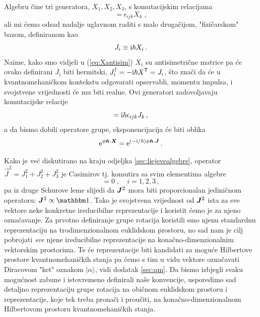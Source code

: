 Algebru čine tri generatora, $X_1, X_2, X_3$, s komutacijskim relacijama
\begin{equation}
          [X_i, X_j] = \epsilon_{ijk} X_k \;,
\end{equation}
ali mi ćemo odsad nadalje uglavnom raditi s malo drugačijom, "fizičarskom" bazom, definiranom
kao
\begin{equation}
 J_i \equiv \textrm{i} \hbar X_i \,.
    \label{eq:jfromX}
\end{equation}
Naime, kako smo vidjeli u (\ref{eq:Xantisim}) $X_i$ su antisimetrične
matrice pa će ovako definirani $J_i$ biti hermitski, $J_{\textrm{i}}^{\dagger}
= - \textrm{i} \hbar X^\mathsf{T} = J_i$, što znači da će u kvantnomehaničkom
kontekstu odgovarati opservabli, momentu impulsa, i svojstvene vrijednosti
će mu biti realne.
Ovi generatori zadovoljavaju komutacijske relacije
\begin{equation}
          [J_i, J_j] = \rmi \hbar \epsilon_{ijk} J_k \,,
\label{eq:SU2algebra}
\end{equation}
a da bismo dobili operatore grupe, eksponencijacija će biti oblika
\begin{equation}
\rme^{\phi\unitn\cdot\vec{X}}=\rme^{(-\rmi/\hbar)\phi\unitn\cdot \vec{J}} \,.
    \label{eq:expJ}
\end{equation}


Kako je već diskutirano na kraju odjeljka \ref{sec:liejevealgebre},
operator $\vec{J}^2 = J_{1}^2 + J_{2}^2 + J_{3}^2$ je Casimirov
tj. komutira sa svim elementima algebre
\begin{equation}
   [\jsq, J_{i}^2]=0\;, \quad i=1,2,3 \,,
\end{equation}
pa iz druge Schurove leme slijedi da $\jsq$ 
mora biti proporcionalan jediničnom operatoru: $\jsq \propto \Eins$.
Tako je svojstvena vrijednost od $\jsq$ ista za sve vektore neke konkretne 
ireducibilne reprezentacije i koristit ćemo je za njeno označavanje.
Za prvotno definiranje grupe rotacija koristili smo njenu standardnu reprezentaciju
na trodimenzionalnom euklidskom prostoru, no sad nam je cilj pobrojati
\emph{sve} njene ireducibilne reprezentacije na konačno-dimenzionalnim
vektorskim prostorima. Te će reprezentacije biti kandidati za moguće
Hilbertove prostore kvantnomehaničkih stanja pa ćemo s tim u vidu vektore
označavati Diracovom "ket" oznakom $|\alpha\rangle$, vidi dodatak \ref{sec:qm}.
Da bismo izbjegli svaku mogućnost zabune i istovremeno definirali
naše konvencije, usporedimo sad detaljno reprezentaciju grupe rotacija
na običnom euklidskom prostoru i reprezentacije, koje tek treba
pronači i proučiti, na konačno-dimenzionalnom Hilbertovom prostoru kvantnomehaničkih stanja.

